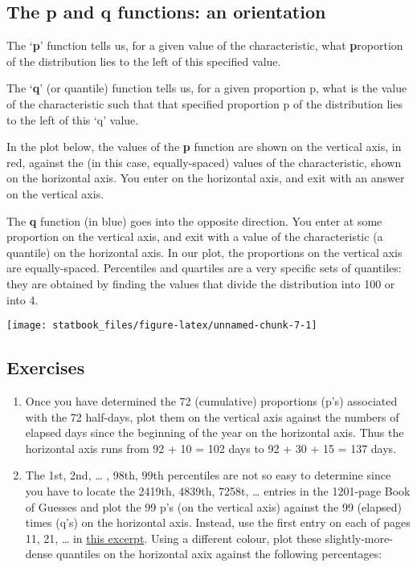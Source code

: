 \documentclass[]{book}
\begin{document}
\hypertarget{the-p-and-q-functions-an-orientation}{%
\subsection{The p and q functions: an orientation}\label{the-p-and-q-functions-an-orientation}}

The `\textbf{p}' function tells us, for a given value of the characteristic, what \textbf{p}roportion of the distribution lies to the left of this specified value.

The `\textbf{q}' (or quantile) function tells us, for a given proportion p, what is the value of the characteristic such that that specified proportion p of the distribution lies to the left of this `q' value.

In the plot below, the values of the \textbf{p} function are shown on the vertical axis, in red, against the (in this case, equally-spaced) values of the characteristic, shown on the horizontal axis. You enter on the horizontal axis, and exit with an answer on the vertical axis.

The \textbf{q} function (in blue) goes into the opposite direction. You enter at some proportion on the vertical axis, and exit with a value of the characteristic (a quantile) on the horizontal axis. In our plot, the proportions on the vertical axis are equally-spaced. Percentiles and quartiles are a very specific sets of quantiles: they are obtained by finding the values that divide the distribution into 100 or into 4.

\begin{center}\texttt{[image: statbook\_files/figure-latex/unnamed-chunk-7-1]} \end{center}

\hypertarget{exercises-1}{%
\subsection{Exercises}\label{exercises-1}}

\begin{enumerate}
\def\labelenumi{\arabic{enumi}.}
\item
  Once you have determined the 72 (cumulative) proportions (p's) associated with the 72 half-days, plot them on the vertical axis against the numbers of elapsed days since the beginning of the year on the horizontal axis. Thus the horizontal axis runs from 92 + 10 = 102 days to 92 + 30 + 15 = 137 days.
\item
  The 1st, 2nd, \ldots{} , 98th, 99th percentiles are not so easy to determine since you have to locate the 2419th, 4839th, 7258t, \ldots{} entries in the 1201-page Book of Guesses and plot the 99 p's (on the vertical axis) against the 99 (elapsed) times (q's) on the horizontal axis. Instead, use the first entry on each of pages 11, 21, \ldots{} in
  \href{http://www.biostat.mcgill.ca/hanley/bios691/SampledPages.pdf}{this excerpt}. Using a different colour, plot these slightly-more-dense quantiles on the horizontal axix against the following percentages:
\end{enumerate}
\end{document}
